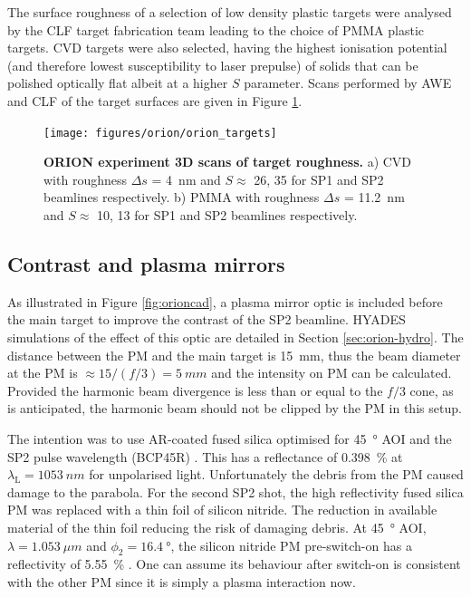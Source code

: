 The surface roughness of a selection of low density plastic targets were analysed by the CLF target fabrication team leading to the choice of PMMA plastic targets. CVD targets were also selected, having the highest ionisation potential (and therefore lowest susceptibility to laser prepulse) of solids that can be polished optically flat albeit at a higher $S$ parameter. Scans performed by AWE and CLF of the target surfaces are given in Figure \ref{fig:oriontargets}.
\begin{figure}
	\centering
	\texttt{[image: figures/orion/orion\_targets]}
	\caption[ORION HHG experiment targets]{\textbf{ORION experiment 3D scans of target roughness.} a) CVD with roughness $\Delta s$ = \qty{4}{nm} and $S \approx$ 26, 35 for SP1 and SP2 beamlines respectively. b) PMMA with roughness $\Delta s$ = \qty{11.2}{nm} and $S \approx$ 10, 13 for SP1 and SP2 beamlines respectively.}
	\label{fig:oriontargets}
\end{figure}

\subsection{Contrast and plasma mirrors}
As illustrated in Figure \ref{fig:orioncad}, a plasma mirror optic is included before the main target to improve the contrast of the SP2 beamline. HYADES simulations of the effect of this optic are detailed in Section \ref{sec:orion-hydro}. The distance between the PM and the main target is \qty{15}{mm}, thus the beam diameter at the PM is $\approx 15/(f/3) = \qty{5}{mm}$ and the intensity on PM can be calculated. Provided the harmonic beam divergence is less than or equal to the $f/3$ cone, as is anticipated, the harmonic beam should not be clipped by the PM in this setup. 

The intention was to use \ac{AR}-coated fused silica optimised for \qty{45}{\degree} \ac{AOI} and the SP2 pulse wavelength (BCP45R) \cite{45AOIBeamsplitter}. This has a reflectance of \qty{0.398}{\%} at $\lambda_\mathrm{L} = \qty{1053}{nm}$ for unpolarised light. Unfortunately the debris from the PM caused damage to the parabola. For the second SP2 shot, the high reflectivity fused silica PM was replaced with a thin foil of silicon nitride. The reduction in available material of the thin foil reducing the risk of damaging debris. At \qty{45}{\degree} \ac{AOI}, $\lambda = \qty{1.053}{\mu m}$ and $\phi_2 = \qty{16.4}{\degree}$, the silicon nitride PM pre-switch-on has a reflectivity of \qty{5.55}{\%} \cite{polyanskiyRefractiveindexInfoDatabase2024}. One can assume its behaviour after switch-on is consistent with the other PM since it is simply a plasma interaction now.

